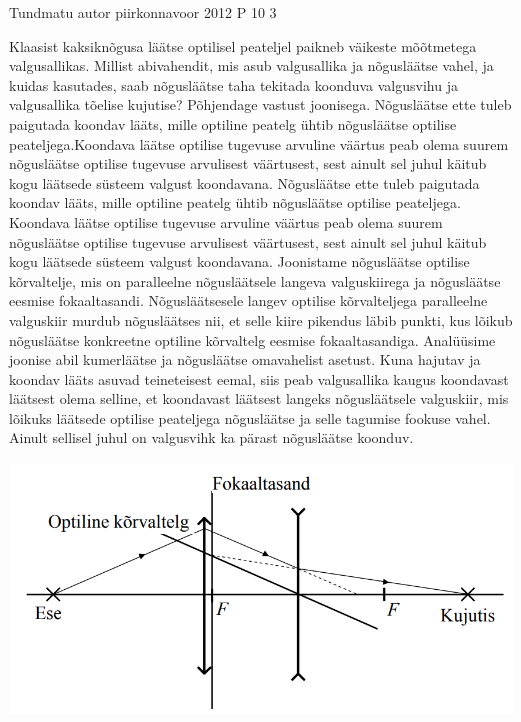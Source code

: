 {Tundmatu autor} %
{piirkonnavoor} %
{2012} %
{P 10} %
{3} %
{
\ifStatement
Klaasist kaksiknõgusa läätse optilisel peateljel paikneb väikeste mõõtmetega valgusallikas. Millist abivahendit, mis asub valgusallika ja nõgusläätse vahel, ja kuidas kasutades, saab nõgusläätse taha tekitada koonduva valgusvihu ja valgusallika tõelise kujutise? Põhjendage vastust joonisega.
\fi
\ifHint
Nõgusläätse ette tuleb paigutada koondav lääts, mille optiline peatelg ühtib nõgusläätse optilise peateljega.Koondava läätse optilise tugevuse arvuline väärtus peab olema suurem nõgusläätse optilise tugevuse arvulisest väärtusest, sest ainult sel juhul käitub kogu läätsede süsteem valgust koondavana.
\fi
\ifSolution
Nõgusläätse ette tuleb paigutada koondav lääts, mille optiline peatelg ühtib nõgusläätse optilise peateljega. Koondava läätse optilise tugevuse arvuline väärtus peab olema suurem nõgusläätse optilise tugevuse arvulisest väärtusest, sest ainult sel juhul käitub kogu läätsede süsteem valgust koondavana. Joonistame nõgusläätse optilise kõrvaltelje, mis on paralleelne nõgusläätsele langeva valguskiirega ja nõgusläätse eesmise fokaaltasandi. Nõgusläätsesele langev optilise kõrvalteljega paralleelne valguskiir murdub nõgusläätses nii, et selle kiire pikendus läbib punkti, kus lõikub nõgusläätse konkreetne optiline kõrvaltelg eesmise fokaaltasandiga. Analüüsime joonise abil kumerläätse ja nõgusläätse omavahelist asetust. Kuna hajutav ja koondav lääts asuvad teineteisest eemal, siis peab valgusallika kaugus koondavast läätsest olema selline, et koondavast läätsest langeks nõgusläätsele valguskiir, mis lõikuks läätsede optilise peateljega nõgusläätse ja selle tagumise fookuse vahel. Ainult sellisel juhul on valgusvihk ka pärast nõgusläätse koonduv.
\begin{center}
	\includegraphics[width=0.5\linewidth]{2012-v2p-10-lah.PNG}
\end{center}
\fi
}
